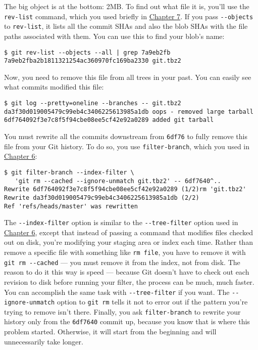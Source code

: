 \documentclass[a4paper]{book}
\newcommand{\prechap}{Chapter }
\newcommand{\postchap}{}
\newcommand{\chapref}[1]{\hyperref[chap:#1]{\prechap #1\postchap}}
\begin{document}
The big object is at the bottom: 2MB. To find out what file it is, you'll use the \texttt{rev-list} command, which you used briefly in \chapref{7}. If you pass \texttt{-{}-objects} to \texttt{rev-list}, it lists all the commit SHAs and also the blob SHAs with the file paths associated with them. You can use this to find your blob's name:

\begin{shaded}\begin{verbatim}
$ git rev-list --objects --all | grep 7a9eb2fb
7a9eb2fba2b1811321254ac360970fc169ba2330 git.tbz2
\end{verbatim}\end{shaded}

Now, you need to remove this file from all trees in your past. You can easily see what commits modified this file:

\begin{shaded}\begin{verbatim}
$ git log --pretty=oneline --branches -- git.tbz2
da3f30d019005479c99eb4c3406225613985a1db oops - removed large tarball
6df764092f3e7c8f5f94cbe08ee5cf42e92a0289 added git tarball
\end{verbatim}\end{shaded}

You must rewrite all the commits downstream from \texttt{6df76} to fully remove this file from your Git history. To do so, you use \texttt{filter-branch}, which you used in \chapref{6}:

\begin{shaded}\begin{verbatim}
$ git filter-branch --index-filter \
   'git rm --cached --ignore-unmatch git.tbz2' -- 6df7640^..
Rewrite 6df764092f3e7c8f5f94cbe08ee5cf42e92a0289 (1/2)rm 'git.tbz2'
Rewrite da3f30d019005479c99eb4c3406225613985a1db (2/2)
Ref 'refs/heads/master' was rewritten
\end{verbatim}\end{shaded}

The \texttt{-{}-index-filter} option is similar to the \texttt{-{}-tree-filter} option used in \chapref{6}, except that instead of passing a command that modifies files checked out on disk, you're modifying your staging area or index each time. Rather than remove a specific file with something like \texttt{rm file}, you have to remove it with \texttt{git rm -{}-cached} --- you must remove it from the index, not from disk. The reason to do it this way is speed --- because Git doesn't have to check out each revision to disk before running your filter, the process can be much, much faster. You can accomplish the same task with \texttt{-{}-tree-filter} if you want. The \texttt{-{}-ignore-unmatch} option to \texttt{git rm} tells it not to error out if the pattern you're trying to remove isn't there. Finally, you ask \texttt{filter-branch} to rewrite your history only from the \texttt{6df7640} commit up, because you know that is where this problem started. Otherwise, it will start from the beginning and will unnecessarily take longer.
\end{document}

